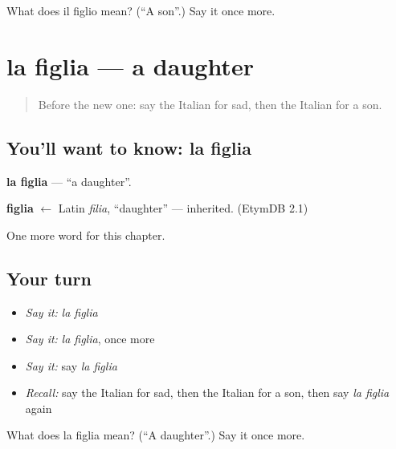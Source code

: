 \begin{tcolorbox}[breakable,colback=teal!4,colframe=teal!35!black,title={Before you move on}]
What does il figlio mean? (\textquotedblleft{}A son\textquotedblright{}.) Say it once more.
\end{tcolorbox}
\section[la figlia]{la figlia — a daughter}

\label{lesson:IT-C44-figlia}



\begin{quote}
Before the new one: say the Italian for sad, then the Italian for a son.
\end{quote}

\subsection*{You'll want to know: la figlia}
\textbf{la figlia} — \textquotedblleft{}a daughter\textquotedblright{}.

\begin{cousinweb}
\textbf{figlia} $\leftarrow$ Latin \emph{filia}, \textquotedblleft{}daughter\textquotedblright{} — inherited. (EtymDB 2.1)
\end{cousinweb}

\begin{grammarlens}[title={What you've built}]
One more word for this chapter.
\end{grammarlens}

\subsection*{Your turn}
\begin{itemize}
\raggedright
  \item \emph{Say it:} \emph{la figlia}
  \item \emph{Say it:} \emph{la figlia}, once more
  \item \emph{Say it:} say \emph{la figlia}
  \item \emph{Recall:} say the Italian for sad, then the Italian for a son, then say \emph{la figlia} again
\end{itemize}

\begin{tcolorbox}[breakable,colback=teal!4,colframe=teal!35!black,title={Before you move on}]
What does la figlia mean? (\textquotedblleft{}A daughter\textquotedblright{}.) Say it once more.
\end{tcolorbox}

